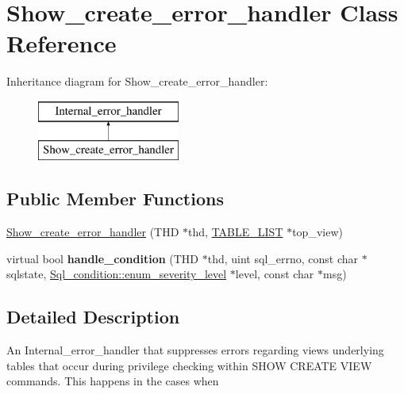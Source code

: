 \hypertarget{classShow__create__error__handler}{}\section{Show\+\_\+create\+\_\+error\+\_\+handler Class Reference}
\label{classShow__create__error__handler}
Inheritance diagram for Show\+\_\+create\+\_\+error\+\_\+handler\+:\begin{figure}[H]
\begin{center}
\leavevmode
\includegraphics[height=2.000000cm]{classShow__create__error__handler}
\end{center}
\end{figure}
\subsection*{Public Member Functions}
\begin{DoxyCompactItemize}
\item 
\mbox{\hyperlink{classShow__create__error__handler_a441315b69de4be2dd6e80159282db7d9}{Show\+\_\+create\+\_\+error\+\_\+handler}} (T\+HD $\ast$thd, \mbox{\hyperlink{structTABLE__LIST}{T\+A\+B\+L\+E\+\_\+\+L\+I\+ST}} $\ast$top\+\_\+view)
\item 
\mbox{\label{classShow__create__error__handler_aede0a32bbc638196ce4e8f33b53d1d6f}} 
virtual bool {\bfseries handle\+\_\+condition} (T\+HD $\ast$thd, uint sql\+\_\+errno, const char $\ast$sqlstate, \mbox{\hyperlink{classSql__condition_ab0602581e19cddb609bfe10c44be4e83}{Sql\+\_\+condition\+::enum\+\_\+severity\+\_\+level}} $\ast$level, const char $\ast$msg)
\end{DoxyCompactItemize}


\subsection{Detailed Description}
An Internal\+\_\+error\+\_\+handler that suppresses errors regarding views\textquotesingle{} underlying tables that occur during privilege checking within S\+H\+OW C\+R\+E\+A\+TE V\+I\+EW commands. This happens in the cases when


